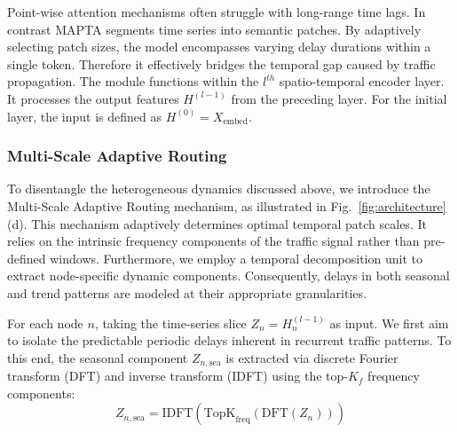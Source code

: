 \documentclass[5p,times,authoryear]{elsarticle}
\begin{document}
Point-wise attention mechanisms often struggle with long-range time lags. In contrast MAPTA segments time series into semantic patches. By adaptively selecting patch sizes, the model encompasses varying delay durations within a single token. Therefore it effectively bridges the temporal gap caused by traffic propagation. The module functions within the $l^{th}$ spatio-temporal encoder layer. It processes the output features $H^{(l-1)}$ from the preceding layer. For the initial layer, the input is defined as $H^{(0)} = X_{\text{embed}}$.


\subsubsection{Multi-Scale Adaptive Routing}

To disentangle the heterogeneous dynamics discussed above, we introduce the Multi-Scale Adaptive Routing mechanism, as illustrated in Fig.~\ref{fig:architecture}(d). This mechanism adaptively determines optimal temporal patch scales. It relies on the intrinsic frequency components of the traffic signal rather than pre-defined windows. Furthermore, we employ a temporal decomposition unit to extract node-specific dynamic components. Consequently, delays in both seasonal and trend patterns are modeled at their appropriate granularities.

For each node $n$, taking the time-series slice $Z_n = H_n^{(l-1)}$ as input. We first aim to isolate the predictable periodic delays inherent in recurrent traffic patterns. To this end, the seasonal component $Z_{n,\mathrm{sea}}$ is extracted via discrete Fourier transform (DFT)\citep{cooley1965algorithm} and inverse transform (IDFT) using the top-$K_f$ frequency components:
\vspace{-3pt}
\begin{equation}
    \label{eq:seasonal_component}
    Z_{n, \text{sea}} = \text{IDFT}(\text{TopK}_{\text{freq}}(\text{DFT}(Z_n)))
\end{equation}
\vspace{-3pt}
\end{document}
